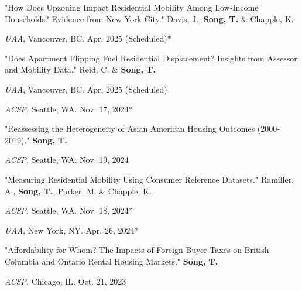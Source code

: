 \documentclass[12pt,letterpaper]{report}
\newcommand{\listitemspace}{0.4em}
\renewenvironment{itemize}
{\begin{list}{}{\setlength{\leftmargin}{0.5em}
                \setlength{\parskip}{0em}
                \setlength{\itemsep}{\listitemspace}
                \setlength{\parsep}{\listitemspace}}}
{\end{list}}
\begin{document}
\begin{itemize}
  \setlength{\itemsep}{-0.0em}  %
  
  \item "How Does Upzoning Impact Residential Mobility Among Low-Income Households? Evidence from New York City." Davis, J., \textbf{Song, T.} \& Chapple, K.
    \begin{itemize}
      \addtolength{\leftskip}{2em} 
      \setlength{\itemsep}{-0.4em}
      \item[•] \emph{UAA}, Vancouver, BC. Apr. 2025 (Scheduled)*
    \end{itemize}

  \item "Does Apartment Flipping Fuel Residential Displacement? Insights from Assessor and Mobility Data." Reid, C. \& \textbf{Song, T.} 
    \begin{itemize}
      \addtolength{\leftskip}{2em} 
      \setlength{\itemsep}{-0.4em}
      \item[•] \emph{UAA}, Vancouver, BC. Apr. 2025 (Scheduled)
      \item[•] \emph{ACSP}, Seattle, WA. Nov. 17, 2024*
    \end{itemize}

  \item "Reassessing the Heterogeneity of Asian American Housing Outcomes (2000-2019)." \textbf{Song, T.} 
    \begin{itemize}
      \addtolength{\leftskip}{2em} 
      \setlength{\itemsep}{-0.4em}
      \item[•] \emph{ACSP}, Seattle, WA. Nov. 19, 2024
    \end{itemize}

  \item "Measuring Residential Mobility Using Consumer Reference Datasets." Ramiller, A., \textbf{Song, T.}, Parker, M. \& Chapple, K. 
  \begin{itemize}
      \addtolength{\leftskip}{2em} 
      \setlength{\itemsep}{-0.4em}
      \item[•] \emph{ACSP}, Seattle, WA. Nov. 18, 2024*
      \item[•] \emph{UAA}, New York, NY. Apr. 26, 2024*
  \end{itemize}

  \item "Affordability for Whom? The Impacts of Foreign Buyer Taxes on British Columbia and Ontario Rental Housing Markets." \textbf{Song, T.} 
  \begin{itemize}
      \addtolength{\leftskip}{2em} 
      \setlength{\itemsep}{-0.4em}
      \item[•] \emph{ACSP}, Chicago, IL. Oct. 21, 2023
  \end{itemize}


\end{itemize}
\end{document}
